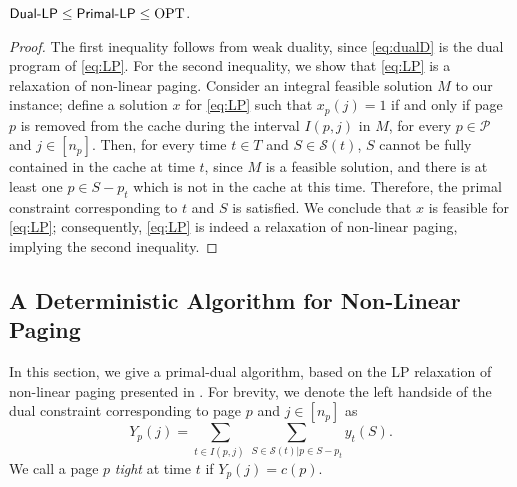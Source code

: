\documentclass[11pt]{article}
\newcommand{\cP}{{\mathcal{P}}}
\newcommand{\cS}{{\mathcal{S}}}
\newcommand{\OPT}{\textnormal{OPT}}
\begin{document}
\begin{lemma}
	\label{lem:relaxation2}
$\textnormal{\textsf{Dual-LP}} \leq \textnormal{\textsf{Primal-LP}} \leq \OPT$.
\end{lemma}

\begin{proof}
	The first inequality follows from weak duality, since \eqref{eq:dualD} is the dual program of \eqref{eq:LP}. For the second inequality, we show that \eqref{eq:LP} is a relaxation of non-linear paging. Consider an integral feasible solution $M$ to our instance; define a solution $x$ for \eqref{eq:LP} such that $x_p(j) = 1$ if and only if page $p$ is removed from the cache during the interval $I(p,j)$ in $M$, for every $p \in \cP$ and $j \in [n_p]$.  Then, for every time $t \in T$ and $S \in \cS(t)$, $S$ cannot be fully contained in the cache at time $t$, since $M$ is a feasible solution, and there is at least one $p \in S-p_t$ which is not in the cache at this time. Therefore, the primal constraint corresponding to $t$ and $S$ is satisfied. We conclude that $x$ is feasible for \eqref{eq:LP}; consequently, \eqref{eq:LP} is indeed a relaxation of non-linear paging, implying the second inequality.   
\end{proof} 


\subsection{A Deterministic Algorithm for Non-Linear Paging}


In this section, we give a primal-dual algorithm, based on the LP relaxation of non-linear paging presented in . For brevity, we denote the left handside of the dual constraint corresponding to page $p$ and $j \in [n_p]$ as
\begin{equation}
	\label{eq:Y}
	Y_p(j) = \sum_{t \in I(p,j)~} \sum_{S \in \cS(t)\big|p \in S-p_t} y_t(S).
\end{equation}
 We call a page $p$ {\em tight} at time $t$ if $Y_p(j) = c(p)$.  
\end{document}
